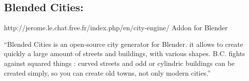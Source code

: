 
\subsection{Blended Cities:} %
\label{sub:blended_cities}

http://jerome.le.chat.free.fr/index.php/en/city-engine/
Addon for Blender

“Blended Cities is an open-source city generator for Blender. it allows to create quickly a large amount of streets and buildings, with various shapes. B.C. fights against squared things : curved streets and odd or cylindric buildings can be created simply, so you can create old towns, not only modern cities.”


